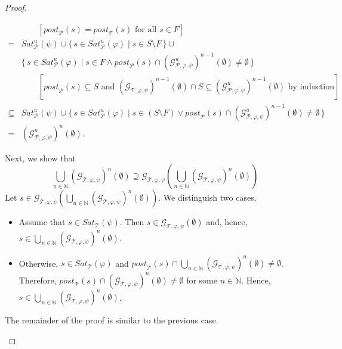 \documentclass[12pt]{article}
\theoremstyle{definition}
\newcommand{\comment}[1]{\hspace{2em}[\mbox{#1}]}
\begin{document}
\begin{proof}
\begin{itemize}
\begin{align*}
& \comment{$\mathit{post}_{\mathcal{P}}(s) = \mathit{post}_{\mathcal{T}}(s)$ for all $s \in F$}\\
= & \mathit{Sat}_{\mathcal{P}}^u(\psi) \cup \{\, s \in \mathit{Sat}_{\mathcal{P}}^u(\varphi) \mid s \in S \setminus F \,\} \cup\\
& \{\, s \in \mathit{Sat}_{\mathcal{P}}^u(\varphi) \mid s \in F \wedge \mathit{post}_{\mathcal{P}}(s) \cap (\mathcal{G}_{\mathcal{P}, \varphi, \psi}^u)^{n-1}(\emptyset) \not= \emptyset \,\}\\
& \comment{$\mathit{post}_{\mathcal{P}}(s) \subseteq S$ and $(\mathcal{G}_{\mathcal{T}, \varphi, \psi})^{n-1}(\emptyset) \cap S
\subseteq (\mathcal{G}_{\mathcal{P}, \varphi, \psi}^{u})^{n-1}(\emptyset)$ by induction}\\
\subseteq & \mathit{Sat}_{\mathcal{P}}^u(\psi) \cup \{\, s \in \mathit{Sat}_{\mathcal{P}}^u(\varphi) \mid s \in (S \setminus F) \vee \mathit{post}_{\mathcal{P}}(s) \cap (\mathcal{G}_{\mathcal{P}, \varphi, \psi}^u)^{n-1}(\emptyset) \not= \emptyset \,\}\\
= & (\mathcal{G}_{\mathcal{P}, \varphi, \psi}^{u})^n(\emptyset).
\end{align*}

Next, we show that
\begin{equation}
\label{equation:}
\bigcup_{n \in \mathbb{N}} (\mathcal{G}_{\mathcal{T}, \varphi, \psi})^n(\emptyset) \supseteq \mathcal{G}_{\mathcal{T}, \varphi, \psi}(\bigcup_{n \in \mathbb{N}} (\mathcal{G}_{\mathcal{T}, \varphi, \psi})^n(\emptyset))
\end{equation}
Let $s \in \mathcal{G}_{\mathcal{T}, \varphi, \psi}(\bigcup_{n \in \mathbb{N}} (\mathcal{G}_{\mathcal{T}, \varphi, \psi})^n(\emptyset))$.  We distinguish two cases.
\begin{itemize}
\item
Assume that $s \in \mathit{Sat}_{\mathcal{T}}(\psi)$.  Then $s \in \mathcal{G}_{\mathcal{T}, \varphi, \psi}(\emptyset)$ and, hence, $s \in \bigcup_{n \in \mathbb{N}} (\mathcal{G}_{\mathcal{T}, \varphi, \psi})^n(\emptyset)$.
\item
Otherwise, $s \in \mathit{Sat}_{\mathcal{T}}(\varphi)$ and $\mathit{post}_{\mathcal{T}}(s) \cap \bigcup_{n \in \mathbb{N}} (\mathcal{G}_{\mathcal{T}, \varphi, \psi})^n(\emptyset) \not= \emptyset$.  Therefore, $\mathit{post}_{\mathcal{T}}(s) \cap (\mathcal{G}_{\mathcal{T}, \varphi, \psi})^n(\emptyset) \not= \emptyset$ for some $n \in \mathbb{N}$.  Hence, $s \in \bigcup_{n \in \mathbb{N}} (\mathcal{G}_{\mathcal{T}, \varphi, \psi})^n(\emptyset)$.
\end{itemize}
The remainder of the proof is similar to the previous case.
\end{itemize}
\end{proof}
\end{document}
